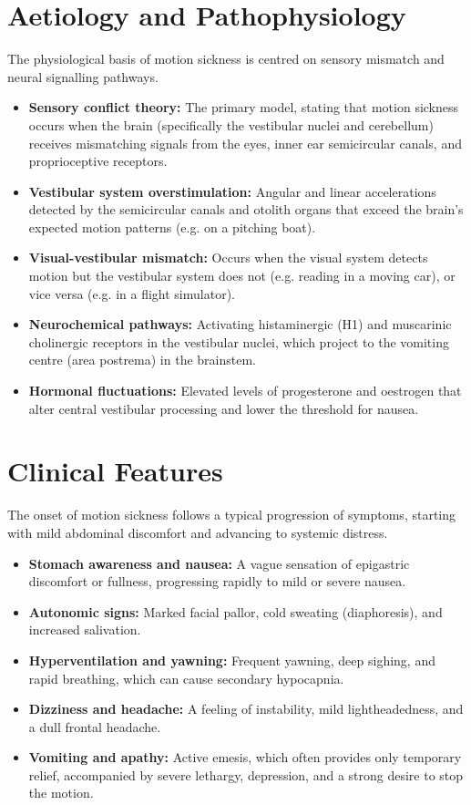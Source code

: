 \section*{Aetiology and Pathophysiology}
The physiological basis of motion sickness is centred on sensory mismatch and neural signalling pathways.
\begin{itemize}
    \item \textbf{Sensory conflict theory:} The primary model, stating that motion sickness occurs when the brain (specifically the vestibular nuclei and cerebellum) receives mismatching signals from the eyes, inner ear semicircular canals, and proprioceptive receptors.
    \item \textbf{Vestibular system overstimulation:} Angular and linear accelerations detected by the semicircular canals and otolith organs that exceed the brain's expected motion patterns (e.g. on a pitching boat).
    \item \textbf{Visual-vestibular mismatch:} Occurs when the visual system detects motion but the vestibular system does not (e.g. reading in a moving car), or vice versa (e.g. in a flight simulator).
    \item \textbf{Neurochemical pathways:} Activating histaminergic (H1) and muscarinic cholinergic receptors in the vestibular nuclei, which project to the vomiting centre (area postrema) in the brainstem.
    \item \textbf{Hormonal fluctuations:} Elevated levels of progesterone and oestrogen that alter central vestibular processing and lower the threshold for nausea.
\end{itemize}

\section*{Clinical Features}
The onset of motion sickness follows a typical progression of symptoms, starting with mild abdominal discomfort and advancing to systemic distress.
\begin{itemize}
    \item \textbf{Stomach awareness and nausea:} A vague sensation of epigastric discomfort or fullness, progressing rapidly to mild or severe nausea.
    \item \textbf{Autonomic signs:} Marked facial pallor, cold sweating (diaphoresis), and increased salivation.
    \item \textbf{Hyperventilation and yawning:} Frequent yawning, deep sighing, and rapid breathing, which can cause secondary hypocapnia.
    \item \textbf{Dizziness and headache:} A feeling of instability, mild lightheadedness, and a dull frontal headache.
    \item \textbf{Vomiting and apathy:} Active emesis, which often provides only temporary relief, accompanied by severe lethargy, depression, and a strong desire to stop the motion.
\end{itemize}

